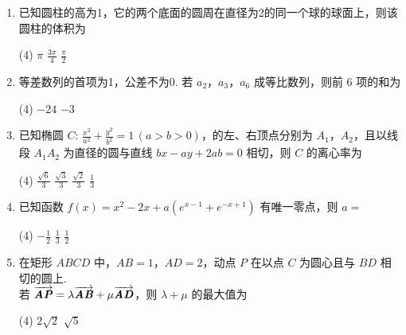 \documentclass[12pt,twoside,space]{ctexart}
\begin{document}
\begin{enumerate}[itemsep=0.2em,topsep=0pt]
\item 已知圆柱的高为1，它的两个底面的圆周在直径为2的同一个球的球面上，则该圆柱的体积为
\begin{tasks}(4)
	\task $\pi$ \task $\frac{3\pi}{4}$ \task $\frac{\pi}{2}$  
\end{tasks}
\item 等差数列的首项为1，公差不为0. 若 $a_2$，$a_3$，$a_6$ 成等比数列，则前 6 项的和为
\begin{tasks}(4)
	\task $-24$ \task $-3$   
\end{tasks}
\item 已知椭圆 $C\colon\,\tfrac{x^2}{a^2}+\tfrac{y^2}{b^2}=1\,(a>b>0)$，的左、右顶点分别为 $A_1$，$A_2$，且以线段 $A_1A_2$ 为直径的圆与直线 $bx-ay+2ab=0$ 相切，则 $C$ 的离心率为
\begin{tasks}(4)
	\task $\frac{\sqrt{6}}{3}$ \task $\frac{\sqrt{3}}{3}$ \task $\frac{\sqrt{2}}{3}$ \task $\frac{1}{3}$ 
\end{tasks}
\item 已知函数 $f(x)=x^2-2x+a(e^{x-1}+e^{-x+1})$ 有唯一零点，则 $a=$
\begin{tasks}(4)
	\task $-\frac{1}{2}$ \task $\frac{1}{3}$ \task $\frac{1}{2}$  
\end{tasks}
\item 在矩形 $ABCD$ 中，$AB=1$，$AD=2$，动点 $P$ 在以点 $C$ 为圆心且与 $BD$ 相切的圆上.\\
若 $\overrightarrow{\textbf{\textit{AP}}}=\lambda\overrightarrow{\textbf{\textit{AB}} }+\mu\overrightarrow{\textbf{\textit{AD}}}$，则 $\lambda+\mu$ 的最大值为
\begin{tasks}(4)
	 \task $2\sqrt{2}$ \task $\sqrt{5}$  
\end{tasks}
\end{enumerate}
\end{document}
